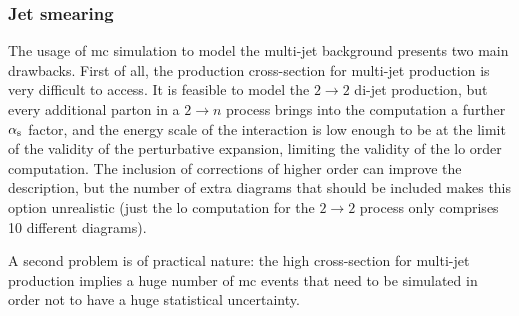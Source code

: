 \subsubsection*{Jet smearing}
\label{sec:jet_smearing}

The usage of \gls{mc} simulation to model the multi-jet background presents two main drawbacks.
First of all, the production cross-section for multi-jet production is very difficult to access. 
It is feasible to model the $2 \to 2$ di-jet production, 
but every additional parton in a $2 \to n$ process brings into the computation a further $\alpha_{\rm{s}}$ factor, 
and the energy scale of the interaction is low enough to be at the limit of the validity of the perturbative expansion, limiting the validity of the \gls{lo} order computation. The inclusion of corrections of higher order can improve the description, but the number of extra diagrams that should be included makes this option unrealistic (just the \gls{lo} computation for the $2 \to 2$ process only comprises 10 different diagrams).

A second problem is of practical nature: the high cross-section for multi-jet production implies a huge number of \gls{mc} events that need to be simulated in order not to have a huge statistical uncertainty. 





